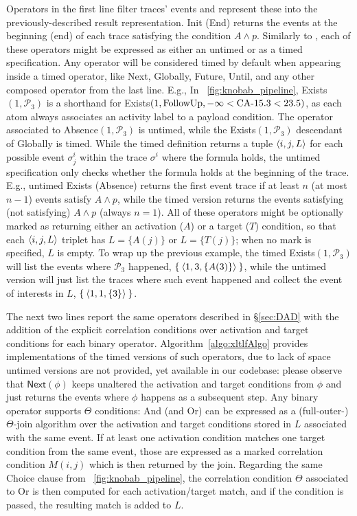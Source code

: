 Operators in the first line filter traces' events and represent these into the previously-described result representation. 
\textsf{Init} (\textsf{End}) returns the events at the beginning (end) of each trace satisfying the condition $A\wedge p$. Similarly to \cite{BurattinMS16}, each of these operators might be expressed as either an untimed or as a timed specification. Any operator will be considered timed by default when appearing inside a timed operator, like \textsf{Next}, \textsf{Globally}, \textsf{Future}, \textsf{Until}, and any other composed operator from the last line. E.g., In \figurename~\ref{fig:knobab_pipeline}, \textsf{Exists}$(1,\mathcal{P}_3)$ is a shorthand for \textsf{Exists}$(1,\textrm{FollowUp},-\infty<\textup{CA-15.3}<23.5)$, as each atom always associates an activity label to a payload condition. The operator associated to \textsf{Absence}$(1,\mathcal{P}_3)$ is untimed, while the \textsf{Exists}$(1,\mathcal{P}_3)$ descendant of \textsf{Globally} is timed.  While the timed definition returns a tuple $\braket{i,j,L}$ for each possible event $\sigma^i_j$ within the trace $\sigma^i$ where the formula holds, the untimed specification only checks whether the formula holds at the beginning of the trace. E.g., untimed \textsf{Exists} (\textsf{Absence}) returns the first event trace if at least $n$ (at most $n-1$) events satisfy $A\wedge p$, while the timed version returns the events satisfying (not satisfying) $A\wedge p$ (always $n=1$). All of these operators might be optionally marked as returning either an activation ($A$) or a target ($T$) condition, so that each  $\braket{i,j,L}$ triplet has $L=\{A(j)\}$ or $L=\{T(j)\}$; when no mark is specified, $L$ is empty. To wrap up the previous example, the timed  \textsf{Exists}$(1,\mathcal{P}_3)$ will list the events where $\mathcal{P}_3$ happened, $\Set{\braket{1,3,\{A(3)\}}}$, while the untimed version will just list the traces where such event happened and collect the event of interests in $L$, $\Set{\braket{1,1,\{3\}}}$.

The next two lines report the same operators described in \S\ref{sec:DAD} with the addition of the explicit correlation conditions over activation and target conditions for each binary operator. Algorithm~\ref{algo:xltlfAlgo} provides  implementations of the timed versions of such operators, due to lack of space untimed versions are not provided, yet available in our codebase: please observe that $\textsf{Next}(\phi)$ keeps unaltered the activation and target conditions from $\phi$ and just returns the events where $\phi$ happens as a subsequent step. Any binary operator supports $\Theta$ conditions:  \textsf{And} (and \textsf{Or}) can be expressed as a (full-outer-)$\Theta$-join algorithm over the activation and target conditions stored in $L$ associated with the same event. If at least one activation condition matches one target condition from the same event, those are expressed as a marked correlation condition $M(i,j)$ which is then returned by the join. Regarding the same \textsf{Choice} clause from \figurename~\ref{fig:knobab_pipeline}, the correlation condition $\Theta$ associated to \textsf{Or} is then computed for each activation/target match, and if the condition is passed, the resulting match is added to $L$. 


